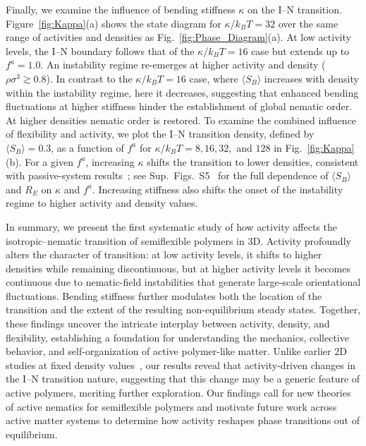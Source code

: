 \documentclass[
reprint,
superscriptaddress,
prl,









 amsmath,amssymb,
 aps,






]{revtex4-2}
\begin{document}
Finally, we examine the influence of bending stiffness $\kappa$ on the I--N transition. Figure~\ref{fig:Kappa}(a) shows the state diagram for $\kappa/k_BT = 32$ over the same range of activities and densities as Fig.~\ref{fig:Phase_Diagram}(a). At low activity levels, the I--N boundary follows that of the $\kappa/k_BT = 16$ case but extends up to $f^{a}=1.0$. An instability regime re-emerges at higher activity and density ($\rho\sigma^3 \gtrsim 0.8$). In contrast to the $\kappa/k_BT = 16$ case, where $\langle S_B \rangle$ increases with density within the instability regime, here it decreases, suggesting that enhanced bending fluctuations at higher stiffness hinder the establishment of global nematic order. At higher densities nematic order is restored. To examine the combined influence of flexibility and activity, we plot the I–N transition density, defined by $\langle S_B \rangle = 0.3$, as a function of $f^{a}$ for $\kappa/k_BT = 8, 16, 32,$ and $128$ in Fig.~\ref{fig:Kappa}(b). For a given $f^a$, increasing $\kappa$ shifts the transition to lower densities, consistent with passive-system results~\cite{Binder_PRL_2016,Egorov2016}; see Sup.~Figs.~S5~\cite{SM} for the full dependence of $\langle S_B \rangle$ and $R_E$ on $\kappa$ and $f^{a}$. Increasing stiffness also shifts the onset of the instability regime to higher activity and density values.

In summary, we present the first systematic study of how activity affects the isotropic–nematic transition of semiflexible polymers in 3D. Activity profoundly alters the character of transition: at low activity levels, it shifts to higher densities while remaining discontinuous, but at higher activity levels it becomes continuous due to nematic-field instabilities that generate large-scale orientational fluctuations. Bending stiffness further modulates both the location of the transition and the extent of the resulting non-equilibrium steady states. Together, these findings uncover the intricate interplay between activity, density, and flexibility, establishing a foundation for understanding the mechanics, collective behavior, and self-organization of active polymer-like matter. Unlike earlier 2D studies at fixed density values~\cite{Henkes2011,Duman2018,Joshi2019}, our results reveal that activity-driven changes in the I–N transition nature, suggesting that this change  may be a generic feature of active polymers, meriting further exploration. Our findings call for new theories of active nematics for semiflexible polymers and motivate future work across active matter systems to determine how activity reshapes phase transitions out of equilibrium.
\end{document}
